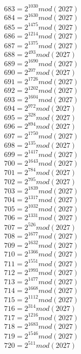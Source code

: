 \documentclass[12pt, letterpaper]{article}
\begin{document}
\begin{itemize}
\begin{multicols}{3}
$683= 2^{1030} mod (2027)$\\
$684= 2^{1630} mod (2027)$\\
$685= 2^{1475} mod (2027)$\\
$686= 2^{1214} mod (2027)$\\
$687= 2^{1375} mod (2027)$\\
$688= 2^{493} mod (2027)$\\
$689= 2^{1690} mod (2027)$\\
$690= 2^{207} mod (2027)$\\
$691= 2^{1726} mod (2027)$\\
$692= 2^{1202} mod (2027)$\\
$693= 2^{1604} mod (2027)$\\
$694= 2^{972} mod (2027)$\\
$695= 2^{328} mod (2027)$\\
$696= 2^{894} mod (2027)$\\
$697= 2^{1750} mod (2027)$\\
$698= 2^{135} mod (2027)$\\
$699= 2^{1417} mod (2027)$\\
$700= 2^{1643} mod (2027)$\\
$701= 2^{784} mod (2027)$\\
$702= 2^{705} mod (2027)$\\
$703= 2^{1839} mod (2027)$\\
$704= 2^{1317} mod (2027)$\\
$705= 2^{1032} mod (2027)$\\
$706= 2^{1331} mod (2027)$\\
$707= 2^{526} mod (2027)$\\
$708= 2^{1677} mod (2027)$\\
$709= 2^{1632} mod (2027)$\\
$710= 2^{1366} mod (2027)$\\
$711= 2^{1551} mod (2027)$\\
$712= 2^{1993} mod (2027)$\\
$713= 2^{1477} mod (2027)$\\
$714= 2^{1668} mod (2027)$\\
$715= 2^{1112} mod (2027)$\\
$716= 2^{314} mod (2027)$\\
$717= 2^{1216} mod (2027)$\\
$718= 2^{1683} mod (2027)$\\
$719= 2^{1546} mod (2027)$\\
$720= 2^{511} mod (2027)$\\

\end{multicols}
\end{itemize}
\end{document}
